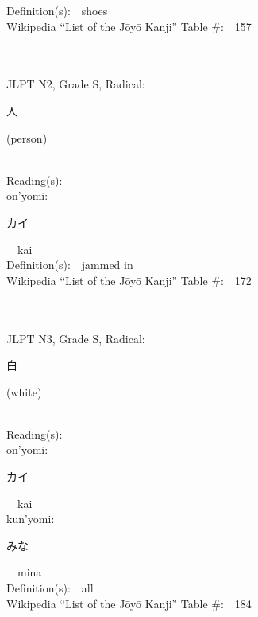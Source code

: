 \begin{multicols}{2}
Definition(s):\ \ shoes \\
Wikipedia ``List of the J\=oy\=o Kanji'' Table \#:\ \ 157 \\
\ \ \\
{\fontsize{34pt}{40pt}  }\ \ \\  %
{JLPT N2, Grade S, Radical:\ \ {\begin{CJK}{UTF8}{min} 人 \end{CJK}} (person) } \\
Reading(s):\ \ \\
{\hspace*{1em}}on'yomi:\ \ \\
{\hspace*{2em}}{\begin{CJK}{UTF8}{min} カイ \end{CJK}}\ \ kai\ \ \\
Definition(s):\ \ jammed in \\
Wikipedia ``List of the J\=oy\=o Kanji'' Table \#:\ \ 172 \\
\ \ \\
{\fontsize{34pt}{40pt}  }\ \ \\  %
{JLPT N3, Grade S, Radical:\ \ {\begin{CJK}{UTF8}{min} 白 \end{CJK}} (white) } \\
Reading(s):\ \ \\
{\hspace*{1em}}on'yomi:\ \ \\
{\hspace*{2em}}{\begin{CJK}{UTF8}{min} カイ \end{CJK}}\ \ kai\ \ \\
{\hspace*{1em}}kun'yomi:\ \ \\
{\hspace*{2em}}{\begin{CJK}{UTF8}{min} みな \end{CJK}}\ \ mina\ \ \\
Definition(s):\ \ all \\
Wikipedia ``List of the J\=oy\=o Kanji'' Table \#:\ \ 184 \\

\end{multicols}
